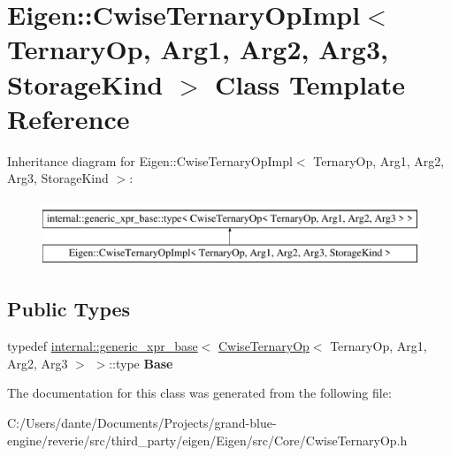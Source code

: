 \hypertarget{class_eigen_1_1_cwise_ternary_op_impl}{}\section{Eigen\+::Cwise\+Ternary\+Op\+Impl$<$ Ternary\+Op, Arg1, Arg2, Arg3, Storage\+Kind $>$ Class Template Reference}
\label{class_eigen_1_1_cwise_ternary_op_impl}
Inheritance diagram for Eigen\+::Cwise\+Ternary\+Op\+Impl$<$ Ternary\+Op, Arg1, Arg2, Arg3, Storage\+Kind $>$\+:\begin{figure}[H]
\begin{center}
\leavevmode
\includegraphics[height=2.000000cm]{class_eigen_1_1_cwise_ternary_op_impl}
\end{center}
\end{figure}
\subsection*{Public Types}
\begin{DoxyCompactItemize}
\item 
\mbox{\label{class_eigen_1_1_cwise_ternary_op_impl_aaef7bd0ab2afd8a60599b23a9f6dab63}} 
typedef \mbox{\hyperlink{struct_eigen_1_1internal_1_1generic__xpr__base}{internal\+::generic\+\_\+xpr\+\_\+base}}$<$ \mbox{\hyperlink{class_eigen_1_1_cwise_ternary_op}{Cwise\+Ternary\+Op}}$<$ Ternary\+Op, Arg1, Arg2, Arg3 $>$ $>$\+::type {\bfseries Base}
\end{DoxyCompactItemize}


The documentation for this class was generated from the following file\+:\begin{DoxyCompactItemize}
\item 
C\+:/\+Users/dante/\+Documents/\+Projects/grand-\/blue-\/engine/reverie/src/third\+\_\+party/eigen/\+Eigen/src/\+Core/Cwise\+Ternary\+Op.\+h\end{DoxyCompactItemize}
